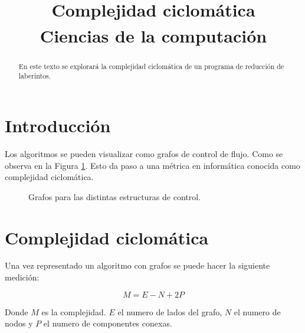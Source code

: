 \documentclass[conference]{IEEEtran}
\begin{document}
\title{Complejidad ciclomática\\
{\footnotesize \textsuperscript{}Ciencias de la computación}
}

\author{

}


\maketitle

\begin{abstract}
En este texto se explorará la complejidad ciclomática de un programa de reducción de laberintos.
\end{abstract}

\section{Introducción}

Los algoritmos se pueden visualizar como grafos de control de flujo. Como se observa en la Figura \ref{fig:control_flujo}. Esto da paso a una métrica en informática conocida como complejidad ciclomática.

\begin{figure}[h]
	\caption{\label{fig:control_flujo} Grafos para las distintas estructuras de control.}
\end{figure}

\section{Complejidad ciclomática}

Una vez representado un algoritmo con grafos se puede hacer la siguiente medición:

\[
	M = E - N + 2P
\]

Donde $M$ es la complejidad. $E$ el numero de lados del grafo, $N$ el numero de nodos y $P$ el numero de componentes conexas.
\end{document}
